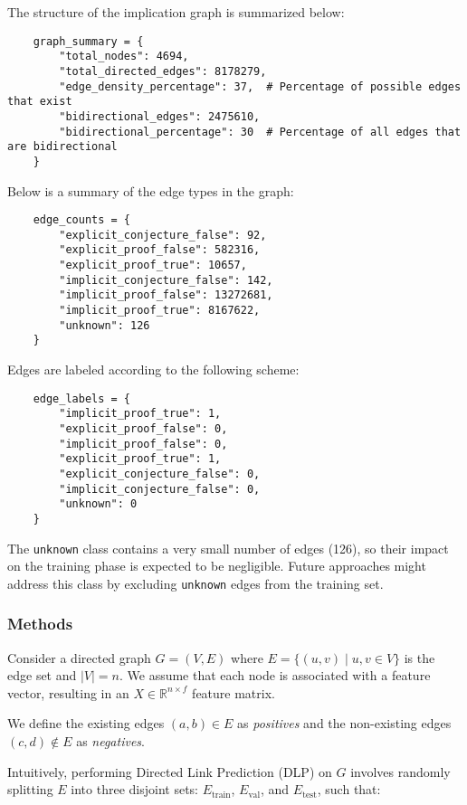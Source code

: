 The structure of the implication graph is summarized below:

\begin{verbatim}
    graph_summary = {
        "total_nodes": 4694,
        "total_directed_edges": 8178279,
        "edge_density_percentage": 37,  # Percentage of possible edges that exist
        "bidirectional_edges": 2475610,
        "bidirectional_percentage": 30  # Percentage of all edges that are bidirectional
    }
\end{verbatim}

Below is a summary of the edge types in the graph:

\begin{verbatim}
    edge_counts = {
        "explicit_conjecture_false": 92,
        "explicit_proof_false": 582316,
        "explicit_proof_true": 10657,
        "implicit_conjecture_false": 142,
        "implicit_proof_false": 13272681,
        "implicit_proof_true": 8167622,
        "unknown": 126
    }
\end{verbatim}

Edges are labeled according to the following scheme:

\begin{verbatim}
    edge_labels = {
        "implicit_proof_true": 1,
        "explicit_proof_false": 0,
        "implicit_proof_false": 0,
        "explicit_proof_true": 1,
        "explicit_conjecture_false": 0,
        "implicit_conjecture_false": 0,
        "unknown": 0
    }
\end{verbatim}

The \texttt{unknown} class contains a very small number of edges (126), so their impact on the
training phase is expected to be negligible. Future approaches might address this class by
excluding \texttt{unknown} edges from the training set.

\subsubsection{Methods}

Consider a directed graph $G = (V, E)$ where $E = \{(u,v) \mid u, v \in V\}$ is the edge set and
$|V| = n$. We assume that each node is associated with a feature vector, resulting in an
$X \in \mathbb{R}^{n \times f}$ feature matrix.

We define the existing edges $(a, b) \in E$ as \emph{positives} and the non-existing edges
$(c, d) \notin E$ as \emph{negatives}.

Intuitively, performing Directed Link Prediction (DLP) on $G$ involves randomly splitting $E$
into three disjoint sets: $E_{\text{train}}$, $E_{\text{val}}$, and $E_{\text{test}}$, such that:

